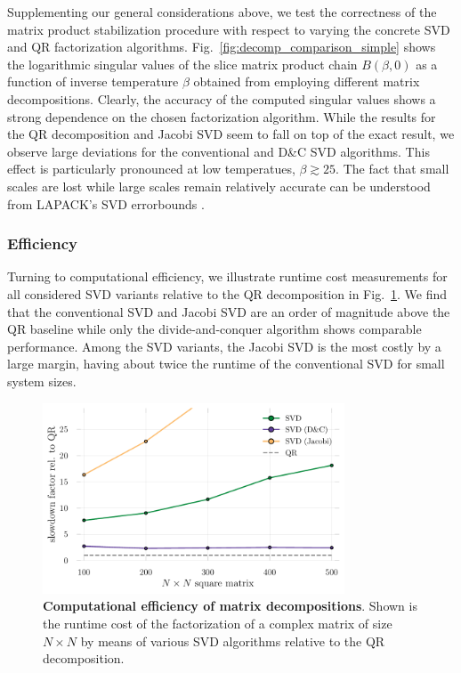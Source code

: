 \documentclass[submission, Phys]{SciPost}
\begin{document}
Supplementing our general considerations above, we test the correctness of the matrix product stabilization procedure with respect to varying the concrete SVD and QR factorization algorithms. Fig.~\ref{fig:decomp_comparison_simple} shows the logarithmic singular values of the slice matrix product chain $B(\beta, 0)$ as a function of inverse temperature $\beta$ obtained from employing different matrix decompositions. Clearly, the accuracy of the computed singular values shows a strong dependence on the chosen factorization algorithm. While the results for the QR decomposition and Jacobi SVD seem to fall on top of the exact result, we observe large deviations for the conventional and D\&C SVD algorithms. This effect is particularly pronounced at low temperatues, $\beta \gtrsim 25$. The fact that small scales are lost while large scales remain relatively accurate can be understood from LAPACK's SVD errorbounds \cite{errorbounds}.

\subsubsection{Efficiency}
Turning to computational efficiency, we illustrate runtime cost measurements for all considered SVD variants relative to the QR decomposition in Fig.~\ref{fig:benchmark_decomps}. We find that the conventional SVD and Jacobi SVD are an order of magnitude above the QR baseline while only the divide-and-conquer algorithm shows comparable performance. Among the SVD variants, the Jacobi SVD is the most costly by a large margin, having about twice the runtime of the conventional SVD for small system sizes.

\begin{figure}
	\centering
	\includegraphics[width=0.8\textwidth]{figures/benchmark_decomps.pdf}
	\caption{\textbf{Computational efficiency of matrix decompositions}. Shown is the runtime cost of the factorization of a complex matrix of size $N \times N$ by means of various SVD algorithms relative to the QR decomposition. \label{fig:benchmark_decomps}}
\end{figure}
\end{document}
